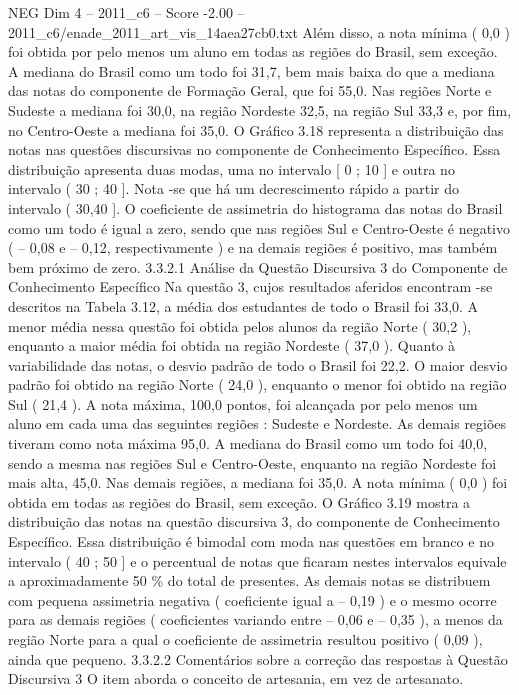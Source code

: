 \begin{textsample}{NEG Dim 4 – 2011\_c6 – Score -2.00 – 2011\_c6/enade\_2011\_art\_vis\_14aea27cb0.txt}
Além disso, a nota mínima ( 0,0 ) foi obtida por pelo menos um aluno em todas as regiões do Brasil, sem exceção.
A mediana do Brasil como um todo foi 31,7, bem mais baixa do que a mediana das notas do componente de Formação Geral, que foi 55,0.
Nas regiões Norte e Sudeste a mediana foi 30,0, na região Nordeste 32,5, na região Sul 33,3 e, por fim, no Centro-Oeste a mediana foi 35,0.
O Gráfico 3.18 representa a distribuição das notas nas questões discursivas no componente de Conhecimento Específico.
Essa distribuição apresenta duas modas, uma no intervalo [ 0 ; 10 ] e outra no intervalo ( 30 ; 40 ].
Nota -se que há um decrescimento rápido a partir do intervalo ( 30,40 ].
O coeficiente de assimetria do histograma das notas do Brasil como um todo é igual a zero, sendo que nas regiões Sul e Centro-Oeste é negativo ( – 0,08 e – 0,12, respectivamente ) e na demais regiões é positivo, mas também bem próximo de zero. 3.3.2.1 Análise da Questão Discursiva 3 do Componente de Conhecimento Específico Na questão 3, cujos resultados aferidos encontram -se descritos na Tabela 3.12, a média dos estudantes de todo o Brasil foi 33,0.
A menor média nessa questão foi obtida pelos alunos da região Norte ( 30,2 ), enquanto a maior média foi obtida na região Nordeste ( 37,0 ).
Quanto à variabilidade das notas, o desvio padrão de todo o Brasil foi 22,2.
O maior desvio padrão foi obtido na região Norte ( 24,0 ), enquanto o menor foi obtido na região Sul ( 21,4 ).
A nota máxima, 100,0 pontos, foi alcançada por pelo menos um aluno em cada uma das seguintes regiões : Sudeste e Nordeste.
As demais regiões tiveram como nota máxima 95,0.
A mediana do Brasil como um todo foi 40,0, sendo a mesma nas regiões Sul e Centro-Oeste, enquanto na região Nordeste foi mais alta, 45,0.
Nas demais regiões, a mediana foi 35,0.
A nota mínima ( 0,0 ) foi obtida em todas as regiões do Brasil, sem exceção.
O Gráfico 3.19 mostra a distribuição das notas na questão discursiva 3, do componente de Conhecimento Específico.
Essa distribuição é bimodal com moda nas questões em branco e no intervalo ( 40 ; 50 ] e o percentual de notas que ficaram nestes intervalos equivale a aproximadamente 50 \% do total de presentes.
As demais notas se distribuem com pequena assimetria negativa ( coeficiente igual a – 0,19 ) e o mesmo ocorre para as demais regiões ( coeficientes variando entre – 0,06 e – 0,35 ), a menos da região Norte para a qual o coeficiente de assimetria resultou positivo ( 0,09 ), ainda que pequeno. 3.3.2.2 Comentários sobre a correção das respostas à Questão Discursiva 3 O item aborda o conceito de artesania, em vez de artesanato.

\end{textsample}
